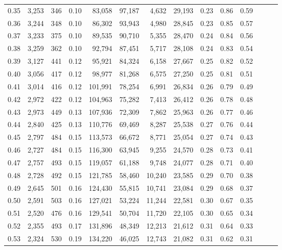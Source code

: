 \begin{tabular}{rrrrrrrrrrrrrr}
0.35 &  3,253 &  346 &  0.10 &   83,058 &   97,187 &   4,632 &  29,193 &  0.23 &  0.86 &      0.59 \\
0.36 &  3,244 &  348 &  0.10 &   86,302 &   93,943 &   4,980 &  28,845 &  0.23 &  0.85 &      0.57 \\
0.37 &  3,233 &  375 &  0.10 &   89,535 &   90,710 &   5,355 &  28,470 &  0.24 &  0.84 &      0.56 \\
0.38 &  3,259 &  362 &  0.10 &   92,794 &   87,451 &   5,717 &  28,108 &  0.24 &  0.83 &      0.54 \\
0.39 &  3,127 &  441 &  0.12 &   95,921 &   84,324 &   6,158 &  27,667 &  0.25 &  0.82 &      0.52 \\
0.40 &  3,056 &  417 &  0.12 &   98,977 &   81,268 &   6,575 &  27,250 &  0.25 &  0.81 &      0.51 \\
0.41 &  3,014 &  416 &  0.12 &  101,991 &   78,254 &   6,991 &  26,834 &  0.26 &  0.79 &      0.49 \\
0.42 &  2,972 &  422 &  0.12 &  104,963 &   75,282 &   7,413 &  26,412 &  0.26 &  0.78 &      0.48 \\
0.43 &  2,973 &  449 &  0.13 &  107,936 &   72,309 &   7,862 &  25,963 &  0.26 &  0.77 &      0.46 \\
0.44 &  2,840 &  425 &  0.13 &  110,776 &   69,469 &   8,287 &  25,538 &  0.27 &  0.76 &      0.44 \\
0.45 &  2,797 &  484 &  0.15 &  113,573 &   66,672 &   8,771 &  25,054 &  0.27 &  0.74 &      0.43 \\
0.46 &  2,727 &  484 &  0.15 &  116,300 &   63,945 &   9,255 &  24,570 &  0.28 &  0.73 &      0.41 \\
0.47 &  2,757 &  493 &  0.15 &  119,057 &   61,188 &   9,748 &  24,077 &  0.28 &  0.71 &      0.40 \\
0.48 &  2,728 &  492 &  0.15 &  121,785 &   58,460 &  10,240 &  23,585 &  0.29 &  0.70 &      0.38 \\
0.49 &  2,645 &  501 &  0.16 &  124,430 &   55,815 &  10,741 &  23,084 &  0.29 &  0.68 &      0.37 \\
0.50 &  2,591 &  503 &  0.16 &  127,021 &   53,224 &  11,244 &  22,581 &  0.30 &  0.67 &      0.35 \\
0.51 &  2,520 &  476 &  0.16 &  129,541 &   50,704 &  11,720 &  22,105 &  0.30 &  0.65 &      0.34 \\
0.52 &  2,355 &  493 &  0.17 &  131,896 &   48,349 &  12,213 &  21,612 &  0.31 &  0.64 &      0.33 \\
0.53 &  2,324 &  530 &  0.19 &  134,220 &   46,025 &  12,743 &  21,082 &  0.31 &  0.62 &      0.31 \\

\end{tabular}
